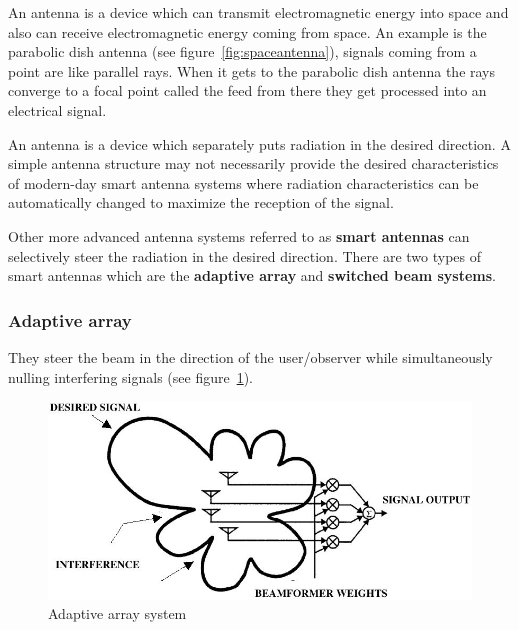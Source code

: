 An antenna is a device which can transmit electromagnetic energy into space and also can receive electromagnetic energy coming from space. An example is the parabolic dish antenna (see figure~\ref{fig:spaceantenna}), signals coming from a point are like parallel rays. When it gets to the parabolic dish antenna the rays converge to a focal point called the feed from there they get processed into an electrical signal.

An antenna is a device which separately puts radiation in the desired direction. A simple antenna structure may not necessarily provide the desired characteristics of modern-day smart antenna systems where radiation characteristics can be automatically changed to maximize the reception of the signal.

Other more advanced antenna systems referred to as \textbf{smart antennas} can selectively steer the radiation in the desired direction. There are two types of smart antennas which are the \textbf{adaptive array} and \textbf{switched beam systems}.

\subsubsection{Adaptive array}
They steer the beam in the direction of the user/observer while simultaneously nulling interfering signals (see figure~\ref{fig:fh06_02}).
\begin{figure}[h]
\centering
\includegraphics[scale=0.3]{./graphics/fh06_02}
\caption{Adaptive array system}
\label{fig:fh06_02}
\end{figure}

